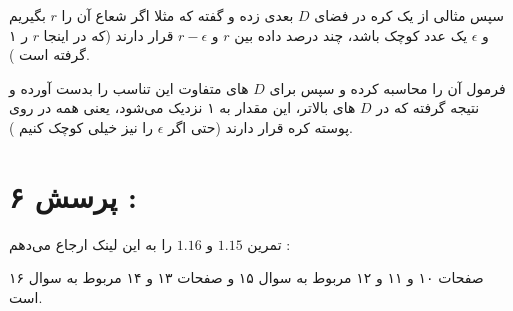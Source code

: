 \documentclass[a4paper, 12pt]{article}
\begin{document}
سپس مثالی از یک کره در فضای 
$D$
بعدی زده و گفته که مثلا اگر شعاع آن را 
$r$
بگیریم و 
$\epsilon$
یک عدد کوچک باشد، چند درصد داده بین 
$r$
و
$r-\epsilon$
قرار دارند (که در اینجا 
$r$
ر ۱ گرفته است
).

فرمول آن را محاسبه کرده و سپس برای 
$D$
های متفاوت این تناسب را بدست آورده و نتیجه گرفته که در 
$D$
های بالاتر، این مقدار به ۱ نزدیک می‌شود، یعنی همه در روی پوسته کره قرار دارند (حتی اگر 
$\epsilon$
را نیز خیلی کوچک کنیم
).



\section*{پرسش ۶ : }

تمرین 
$1.15$
و
$1.16$
را به این لینک ارجاع می‌دهم :

\begin{center}
	\href{https://github.com/zhengqigao/PRML-Solution-Manual}{}
\end{center}

صفحات ۱۰ و ۱۱ و ۱۲ مربوط به سوال ۱۵ و صفحات ۱۳ و ۱۴ مربوط به سوال ۱۶ است. 









% 
% 	
\end{document}
